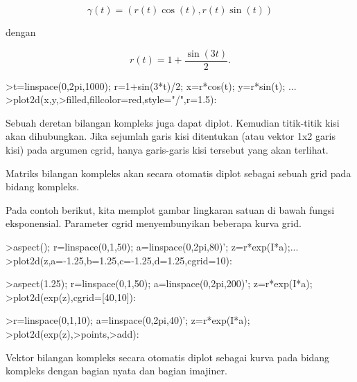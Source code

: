 \documentclass[a4paper,10pt]{article}
\begin{document}
\begin{eulernotebook}
\begin{eulercomment}
\begin{eulercomment}
\begin{eulercomment}
\begin{eulercomment}
\begin{eulercomment}
\begin{eulercomment}
\begin{eulercomment}
\begin{eulercomment}
\begin{eulercomment}
\begin{eulercomment}
\begin{eulercomment}
\end{eulercomment}
\begin{eulerformula}
\[
\gamma(t) = (r(t) \cos(t), r(t) \sin(t))
\]
\end{eulerformula}
\begin{eulercomment}
dengan

\end{eulercomment}
\begin{eulerformula}
\[
r(t) = 1 + \dfrac{\sin(3t)}{2}.
\]
\end{eulerformula}
\begin{eulerprompt}
>t=linspace(0,2pi,1000); r=1+sin(3*t)/2; x=r*cos(t); y=r*sin(t); ...
>plot2d(x,y,>filled,fillcolor=red,style="/",r=1.5):
\end{eulerprompt}
\begin{eulercomment}
Sebuah deretan bilangan kompleks juga dapat diplot. Kemudian
titik-titik kisi akan dihubungkan. Jika sejumlah garis kisi ditentukan
(atau vektor 1x2 garis kisi) pada argumen cgrid, hanya garis-garis
kisi tersebut yang akan terlihat.

Matriks bilangan kompleks akan secara otomatis diplot sebagai sebuah
grid pada bidang kompleks.

Pada contoh berikut, kita memplot gambar lingkaran satuan di bawah
fungsi eksponensial. Parameter cgrid menyembunyikan beberapa kurva
grid.
\end{eulercomment}
\begin{eulerprompt}
>aspect(); r=linspace(0,1,50); a=linspace(0,2pi,80)'; z=r*exp(I*a);...
>plot2d(z,a=-1.25,b=1.25,c=-1.25,d=1.25,cgrid=10):
\end{eulerprompt}
\begin{eulerprompt}
>aspect(1.25); r=linspace(0,1,50); a=linspace(0,2pi,200)'; z=r*exp(I*a);
>plot2d(exp(z),cgrid=[40,10]):
\end{eulerprompt}
\begin{eulerprompt}
>r=linspace(0,1,10); a=linspace(0,2pi,40)'; z=r*exp(I*a);
>plot2d(exp(z),>points,>add):
\end{eulerprompt}
\begin{eulercomment}
Vektor bilangan kompleks secara otomatis diplot sebagai kurva pada
bidang kompleks dengan bagian nyata dan bagian imajiner.



\end{eulercomment}
\end{eulercomment}
\end{eulercomment}
\end{eulercomment}
\end{eulercomment}
\end{eulercomment}
\end{eulercomment}
\end{eulercomment}
\end{eulercomment}
\end{eulercomment}
\end{eulercomment}
\end{eulernotebook}
\end{document}
